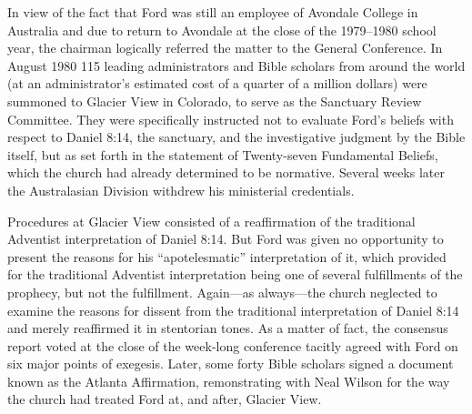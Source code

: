 In view of the fact that Ford was still an employee of Avondale College in
Australia and due to return to Avondale at the close of the 1979--1980 school
year, the chairman logically referred the matter to the General Conference.
In August 1980 115 leading administrators and Bible scholars from around the
world (at an administrator's estimated cost of a quarter of a million
dollars) were summoned to Glacier View in Colorado, to serve as the
Sanctuary Review Committee. They were specifically instructed not to
evaluate Ford's beliefs with respect to Daniel 8:14, the sanctuary, and the
investigative judgment by the Bible itself, but as set forth in the
statement of Twenty-seven Fundamental Beliefs, which the church had already
determined to be normative. Several weeks later the Australasian Division
withdrew his ministerial credentials.

Procedures at Glacier View consisted of a reaffirmation of the traditional
Adventist interpretation of Daniel 8:14. But Ford was given no opportunity
to present the reasons for his ``apotelesmatic'' interpretation of it, which
provided for the traditional Adventist interpretation being one of several
fulfillments of the prophecy, but not the fulfillment. Again---as
always---the church neglected to examine the reasons for dissent from the
traditional interpretation of Daniel 8:14 and merely reaffirmed it in
stentorian tones. As a matter of fact, the consensus report voted at the
close of the week-long conference tacitly agreed with Ford on six major
points of exegesis. Later, some forty Bible scholars signed a document known
as the Atlanta Affirmation, remonstrating with Neal Wilson for the way the
church had treated Ford at, and after, Glacier View.

